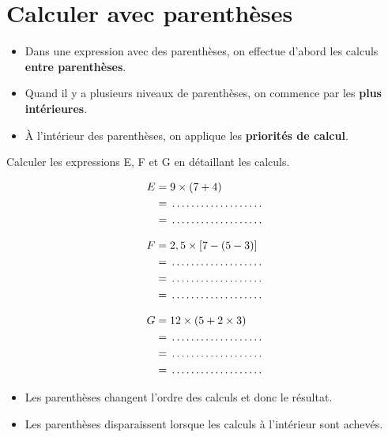 \section{Calculer avec parenthèses}

\begin{proprietebox}
\begin{itemize}[label = \textbullet]
\item Dans une expression avec des parenthèses, on effectue d'abord les calculs \textbf{entre parenthèses}.
\item Quand il y a plusieurs niveaux de parenthèses, on commence par les \textbf{plus intérieures}.
\item À l'intérieur des parenthèses, on applique les \textbf{priorités de calcul}.
\end{itemize}
\end{proprietebox}

\begin{examplebox}
Calculer les expressions E, F et G en détaillant les calculs.

\begin{minipage}[t]{0.32\textwidth}
\begin{align*}
E &= 9 \times (7 + 4) \\
&= \trous{3cm} \\
&= \trous{3cm}
\end{align*}
\end{minipage}
\hfill
\begin{minipage}[t]{0.32\textwidth}
\begin{align*}
F &= 2,5 \times [7 - (5 - 3)] \\
&= \trous{3cm}\\
&= \trous{3cm}\\
&= \trous{3cm}
\end{align*}
\end{minipage}
\hfill
\begin{minipage}[t]{0.32\textwidth}
\begin{align*}
G &= 12 \times (5 + 2 \times 3) \\
&= \trous{3cm} \\
&= \trous{3cm} \\
&= \trous{3cm}
\end{align*}
\end{minipage}
\end{examplebox}

\begin{remarkbox}
\begin{itemize}[label = \textbullet]
\item Les parenthèses changent l'ordre des calculs et donc le résultat.
\item Les parenthèses disparaissent lorsque les calculs à l'intérieur sont achevés.
\end{itemize}
\end{remarkbox}

